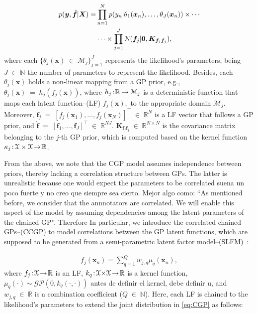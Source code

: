 \documentclass[journal]{IEEEtran}
\providecommand{\ve}[1]{{\bm{#1}}}%
\providecommand{\mat}[1]{{\bm{#1}}} %
\newcommand{\Real}{\mathbb{R}}
\DeclareMathOperator{\en}{\!\,\in\!\,}
\DeclareMathOperator{\igual}{\!\,=\!\,}
\providecommand{\s}[1]{\negthinspace#1\negthinspace}%
\providecommand{\ve}[1]{{\mathbf{#1}}}
\providecommand{\mat}[1]{{\mathbf{#1}}}
\newcommand{\gauss}{\mathcal{N}} %
\newcommand{\comment}[2]{{\color{blue}#1} {\color{red}#2}}
\begin{document}
\begin{align}
    \notag p(\ve{y}, \hat{\ve{f}}| \mat{X}) =& \prod_{n=1}^{N}p(y_n|\theta_1(\ve{x}_n),\dots , \theta_J(\ve{x}_n))\times \cdots \\
    &\cdots \times \prod_{j=1}^{J}\gauss(\ve{f}_j|\ve{0},\mat{K}_{\ve{f}_j\ve{f}_j})\label{eq:CGP},
\end{align}
where each $\{\theta_j(\ve{x}) \en \mathcal{M}_j\}_{j=1}^{J}$ represents the likelihood's parameters, being $J\en\mathbb{N}$ the number of parameters to represent the likelihood. Besides, each $\theta_j(\ve{x})$ holds a non-linear mapping from a GP prior, e.g., $\theta_j(\ve{x})\igual h_j(f_j(\ve{x}))$, where $h_j\s{:}\Real\to \mathcal{M}_j$ is a deterministic function that maps each latent function--(LF) $f_j(\ve{x}),$ to the appropriate domain $\mathcal{M}_j$. Moreover, $\ve{f}_j\igual\left[f_j(\ve{x}_1), \dots , f_j(\ve{x}_N)\right]^{\top}\en\Real^{N}$ is a LF vector that follows a GP prior, and $\hat{\ve{f}}\igual\left[\ve{f}_1, \dots , \ve{f}_J\right]^{\top}\en \Real^{NJ}$. $\mat{K}_{\ve{f}_j\ve{f}_j} \en\Real^{N\times N}$ is the covariance matrix belonging to the $j$-th GP prior, which is computed based on the kernel function  $\kappa_{j}\s{:}\mathcal{X}\times\mathcal{X}\s{\to}\Real$.

From the above, we note that the CGP model assumes independence
between priors, thereby lacking a correlation structure between
GPs. \comment{The latter is unrealistic because one would expect the
  parameters to be correlated}{suena un poco fuerte y no creo que
  siempre sea cierto. Mejor algo como: ``As mentioned before, we 
  consider that the annnotators are correlated. We will enable this
  aspect of the model by
  assuming dependencies among the latent parameters of the chained
  GP''}. \comment{Therefore}{In particular}, we introduce the correlated chained GPs--(CCGP) to model correlations between the GP latent functions, which are supposed to be generated from a semi-parametric latent factor model--(SLFM)~\cite{teh2005semiparametric}:

\begin{align}
\label{eq:SLFM}
f_j(\ve{x}_n) = \sum_{q=1}^{Q} w_{j,q} \mu_{q}(\ve{x}_n),
\end{align}
where $f_j\s{:}\mathcal{X}\s{\to}\Real$ is an LF,
\comment{${k}_q\s{:}\mathcal{X}{\times}\mathcal{X}\s{\to}\Real$ is a
  kernel function, $\mu_q(\cdot) \sim \mathcal{GP}(0,{k}_q(\cdot,
  \cdot))$}{antes de definir el kernel, debe definir u}, and $w_{j,q}\en\Real$ is a combination coefficient ($Q\en\mathbb{N}$). Here, each LF is chained to the likelihood's parameters to extend the joint distribution in \cref{eq:CGP} as follows:
\end{document}
